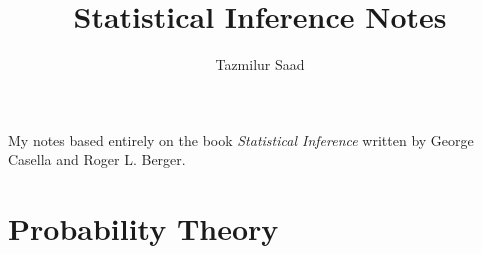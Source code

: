 \documentclass{book}
\begin{document}
    \title{Statistical Inference Notes}
    \author{Tazmilur Saad}

    \maketitle

    \clearpage
    \begin{center}
        \thispagestyle{empty}
        \vspace*{\fill}
        My notes based entirely on the book \textit{Statistical Inference} written by George Casella and Roger L. Berger.
        \vspace*{\fill}
    \end{center}
    \clearpage
    
    \tableofcontents

    \chapter{Probability Theory}

    
\end{document}
